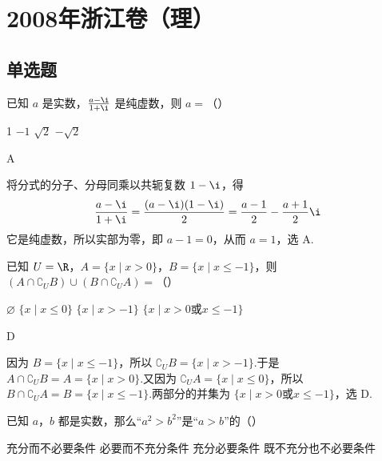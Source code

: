 \chapter{2008年浙江卷（理）}

\section{单选题}

\begin{problem}
已知 \(a\) 是实数，\( \frac{a-\i}{1+\i} \) 是纯虚数，则 \(a=\)（\quad）

\choices
    {1}
    {\(-1\)}
    {\(\sqrt{2}\)}
    {\(-\sqrt{2}\)}
\end{problem}

\begin{answer}
A
\end{answer}

\begin{solution}
将分式的分子、分母同乘以共轭复数 \(1-\i\)，得
\[
\frac{a-\i}{1+\i}=\frac{(a-\i)(1-\i)}{2}=\frac{a-1}{2}-\frac{a+1}{2}\i
\]
它是纯虚数，所以实部为零，即 \(a-1=0\)，从而 \(a=1\)，选 A.
\end{solution}

\begin{problem}
已知 \(U = \R\)，\(A = \{x \mid x > 0\}\)，\(B = \{x \mid x \leqslant -1\}\)，则 \(\left(A \cap \complement_U B\right) \cup \left(B \cap \complement_U A\right) =\)（\quad）

\choices
    {\(\varnothing\)}
    {\(\{x\mid x\leqslant 0\}\)}
    {\( \{x \mid x > -1\} \)}
    {\(\{x\mid x > 0\text{或} x\leqslant -1\}\)}
\end{problem}

\begin{answer}
D
\end{answer}

\begin{solution}
因为 \(B=\{x\mid x\leqslant-1\}\)，所以 \(\complement_U B=\{x\mid x>-1\}\).于是
\(A\cap\complement_U B=A=\{x\mid x>0\}\).又因为 \(\complement_U A=\{x\mid x\leqslant0\}\)，所以
\(B\cap\complement_U A=B=\{x\mid x\leqslant-1\}\).两部分的并集为
\(\{x\mid x>0\text{或}x\leqslant-1\}\)，选 D.
\end{solution}

\begin{problem}
已知 \(a\)，\(b\) 都是实数，那么“\(a^2 > b^2\)”是“\(a > b\)”的（\quad）

\choices
    {充分而不必要条件}
    {必要而不充分条件}
    {充分必要条件}
    {既不充分也不必要条件}
\end{problem}

